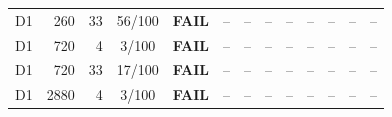\documentclass[10pt,a4paper]{article}
\begin{document}
\begin{longtable}{crrcp{33mm}rrrrrrrr}
D1 & 260 & 33 & 56/100 & \textbf{FAIL} & -- & -- & -- & -- & -- & -- & -- & --\\
D1 & 720 & 4 & 3/100 & \textbf{FAIL} & -- & -- & -- & -- & -- & -- & -- & --\\
D1 & 720 & 33 & 17/100 & \textbf{FAIL} & -- & -- & -- & -- & -- & -- & -- & --\\
D1 & 2880 & 4 & 3/100 & \textbf{FAIL} & -- & -- & -- & -- & -- & -- & -- & --\\

\end{longtable}
\end{document}
